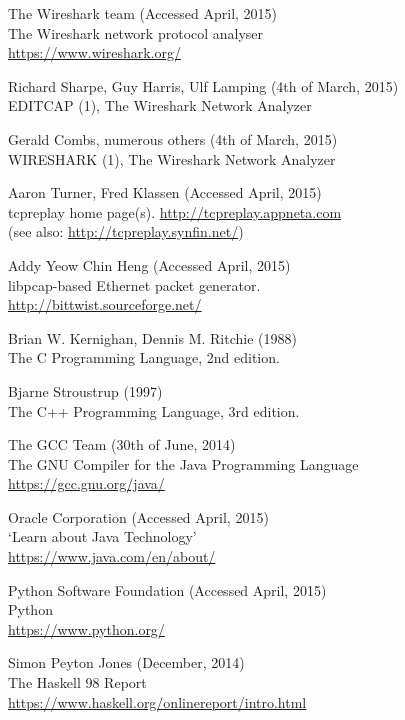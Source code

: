 \documentclass[10pt,a4paper,notitlepage]{report}
\begin{document}
\begin{thebibliography}{99}
	The Wireshark team (Accessed April, 2015)\\
	The Wireshark network protocol analyser\\
	\url{https://www.wireshark.org/}

    Richard Sharpe, Guy Harris, Ulf Lamping (4th of March, 2015)\\
    EDITCAP (1), The Wireshark Network Analyzer

    Gerald Combs, numerous others (4th of March, 2015)\\
    WIRESHARK (1), The Wireshark Network Analyzer

    Aaron Turner, Fred Klassen (Accessed April, 2015)\\
    tcpreplay home page(s).
    \url{http://tcpreplay.appneta.com}\\
    (see also: \url{http://tcpreplay.synfin.net/})

    Addy Yeow Chin Heng (Accessed April, 2015)\\
    libpcap-based Ethernet packet generator.\\
    \url{http://bittwist.sourceforge.net/}

	Brian W. Kernighan, Dennis M. Ritchie (1988)\\
	The C Programming Language, 2nd edition.

	Bjarne Stroustrup (1997)\\
	The C++ Programming Language, 3rd edition.

	The GCC Team (30th of June, 2014)\\
	The GNU Compiler for the Java Programming Language\\
	\url{https://gcc.gnu.org/java/}

	Oracle Corporation (Accessed April, 2015)\\
	`Learn about Java Technology'\\
	\url{https://www.java.com/en/about/}

	Python Software Foundation (Accessed April, 2015)\\
	Python\\
	\url{https://www.python.org/}

    Simon Peyton Jones (December, 2014)\\
    The Haskell 98 Report\\
    \url{https://www.haskell.org/onlinereport/intro.html}


\end{thebibliography}
\end{document}
